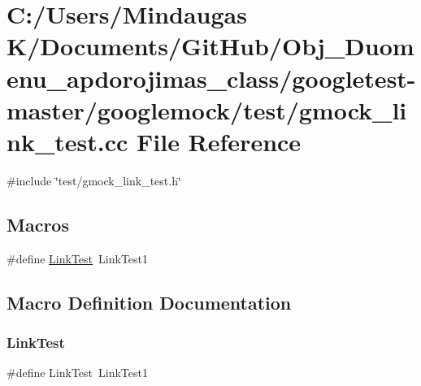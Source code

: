 \hypertarget{googletest-master_2googlemock_2test_2gmock__link__test_8cc}{}\section{C\+:/\+Users/\+Mindaugas K/\+Documents/\+Git\+Hub/\+Obj\+\_\+\+Duomenu\+\_\+apdorojimas\+\_\+class/googletest-\/master/googlemock/test/gmock\+\_\+link\+\_\+test.cc File Reference}
\label{googletest-master_2googlemock_2test_2gmock__link__test_8cc}
{\ttfamily \#include \char`\"{}test/gmock\+\_\+link\+\_\+test.\+h\char`\"{}}\newline
\subsection*{Macros}
\begin{DoxyCompactItemize}
\item 
\#define \mbox{\hyperlink{googletest-master_2googlemock_2test_2gmock__link__test_8cc_afb3d3e7fd53242710a55460595d750bb}{Link\+Test}}~Link\+Test1
\end{DoxyCompactItemize}


\subsection{Macro Definition Documentation}
\mbox{\label{googletest-master_2googlemock_2test_2gmock__link__test_8cc_afb3d3e7fd53242710a55460595d750bb}} 
\subsubsection{\texorpdfstring{LinkTest}{LinkTest}}
{\footnotesize\ttfamily \#define Link\+Test~Link\+Test1}

